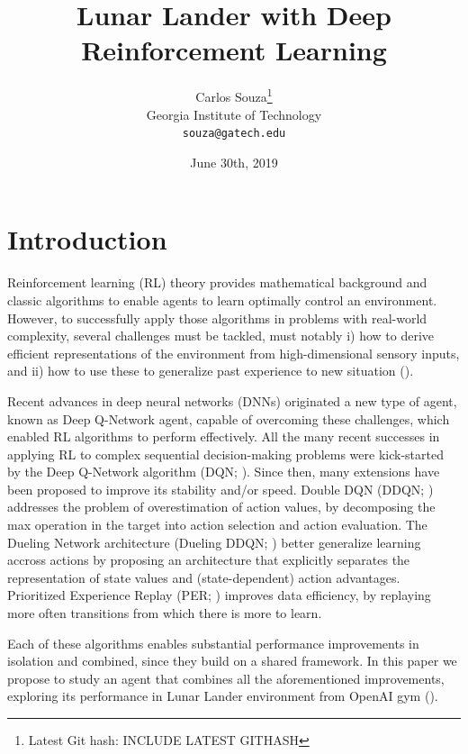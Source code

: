 \documentclass{article}
\title{Lunar Lander with Deep Reinforcement Learning}
\date{June 30th, 2019}
\author{
Carlos Souza\thanks{Latest Git hash: INCLUDE LATEST GITHASH}\\
Georgia Institute of Technology\\
\texttt{souza@gatech.edu} \\
}
\begin{document}
    \maketitle



    \section{Introduction}
    \label{sec:introduction}
    Reinforcement learning (RL) theory provides mathematical background and classic algorithms to enable agents to learn optimally control an environment.
    However, to successfully apply those algorithms in problems with real-world complexity, several challenges must be tackled, must notably i) how to derive efficient representations of the environment from high-dimensional sensory inputs, and ii) how to use these to generalize past experience to new situation (\cite{dqn}).

    Recent advances in deep neural networks (DNNs) originated a new type of agent, known as Deep Q-Network agent, capable of overcoming these challenges, which enabled RL algorithms to perform effectively.
    All the many recent successes in applying RL to complex sequential decision-making problems were kick-started by the Deep Q-Network algorithm (DQN; \cite{dqn}).
    Since then, many extensions have been proposed to improve its stability and/or speed.
Double DQN (DDQN; \cite{ddqn}) addresses the problem of overestimation of action values, by decomposing the max operation in the target into action selection and action evaluation.
    The Dueling Network architecture (Dueling DDQN; \cite{dueling}) better generalize learning accross actions by proposing an architecture that explicitly separates the representation of state values and (state-dependent) action advantages.
    Prioritized Experience Replay (PER; \cite{per}) improves data efficiency, by replaying more often transitions from which there is more to learn.

    Each of these algorithms enables substantial performance improvements in isolation and combined, since they build on a shared framework.
    In this paper we propose to study an agent that combines all the aforementioned improvements, exploring its performance in Lunar Lander environment from OpenAI gym (\cite{openai}).
\end{document}
